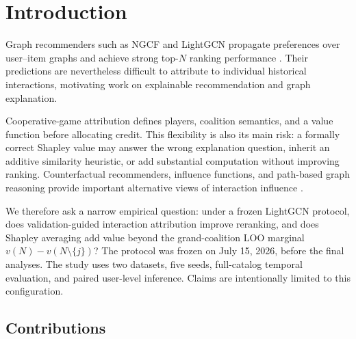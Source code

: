 \documentclass[pdflatex,sn-mathphys-num]{sn-jnl}
\begin{document}

\maketitle

\section{Introduction}\label{sec:introduction}

Graph recommenders such as NGCF and LightGCN propagate preferences over user--item graphs and achieve strong top-$N$ ranking performance \cite{wang2019ngcf,he2020lightgcn,wu2022surveygnn}. Their predictions are nevertheless difficult to attribute to individual historical interactions, motivating work on explainable recommendation \cite{zhang2020explainable} and graph explanation.

Cooperative-game attribution defines players, coalition semantics, and a value function before allocating credit. This flexibility is also its main risk: a formally correct Shapley value may answer the wrong explanation question, inherit an additive similarity heuristic, or add substantial computation without improving ranking. Counterfactual recommenders, influence functions, and path-based graph reasoning provide important alternative views of interaction influence \cite{koh2017influence,ghazimatin2020prince,tran2021counterfactual,xian2019reinforcement}.

We therefore ask a narrow empirical question: under a frozen LightGCN protocol, does validation-guided interaction attribution improve reranking, and does Shapley averaging add value beyond the grand-coalition LOO marginal $v(N)-v(N\setminus\{j\})$? The protocol was frozen on July 15, 2026, before the final analyses. The study uses two datasets, five seeds, full-catalog temporal evaluation, and paired user-level inference. Claims are intentionally limited to this configuration.

\subsection{Contributions}\label{subsec:contributions}
\end{document}
